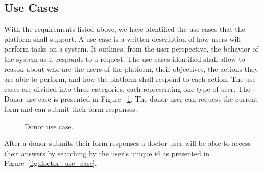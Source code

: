 \subsection{Use Cases}
With the requirements listed above, we have identified the use cases that the platform
shall support. A use case is a written description of how users will perform tasks on
a system. It outlines, from the user perspective, the behavior of the system as it
responds to a request. The use cases identified shall allow to reason about who are the
users of the platform, their objectives, the actions they are able to perform, and how
the platform shall respond to each action.
The use cases are divided into three categories, each representing one type of user.
The Donor use case is presented in Figure ~\ref{fig:donor_use_case}. The donor user can request the current form and can submit their form responses.

\begin{figure}[H]
	\begin{center}
	\end{center}
	\caption{Donor use case.}\label{fig:donor_use_case}
\end{figure}

After a donor submits their form responses a doctor user will be able to access their answers by searching by the user's unique id as presented in Figure~\ref{fig:doctor_use_case}.

